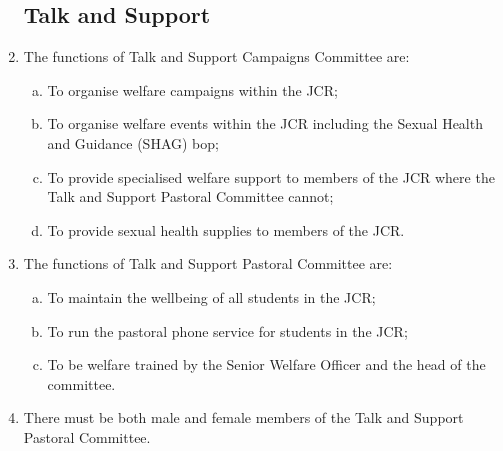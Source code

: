 \documentclass[12pt]{article}
\begin{document}
\begin{enumerate}
    \subsection{Talk and Support}
    \item The functions of Talk and Support Campaigns Committee are:
    \begin{enumerate}[(a)]
        \item To organise welfare campaigns within the JCR;
        \item To organise welfare events within the JCR including the Sexual Health and Guidance (SHAG) bop;
        \item To provide specialised welfare support to members of the JCR where the Talk and Support Pastoral Committee cannot;
        \item To provide sexual health supplies to members of the JCR.
    \end{enumerate}
    \item The functions of Talk and Support Pastoral Committee are:
    \begin{enumerate}[(a)]
        \item To maintain the wellbeing of all students in the JCR;
        \item To run the pastoral phone service for students in the JCR;
        \item To be welfare trained by the Senior Welfare Officer and the head of the committee.
    \end{enumerate}
    \item There must be both male and female members of the Talk and Support Pastoral Committee.


\end{enumerate}
\end{document}
